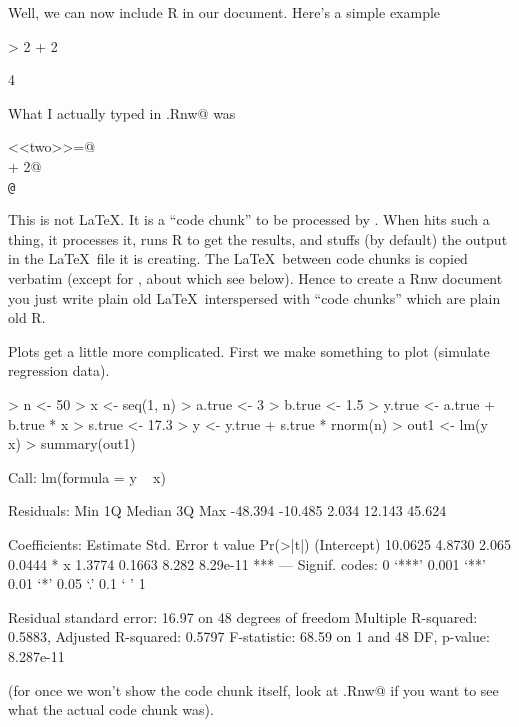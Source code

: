 \documentclass{article}
\begin{document}
Well, we can now include R in our document.  Here's a simple example
\begin{Schunk}
\begin{Sinput}
> 2 + 2
\end{Sinput}
\begin{Soutput}
[1] 4
\end{Soutput}
\end{Schunk}
What I actually typed in \verb@foo.Rnw@ was
\begin{tabbing}
\verb@<<two>>=@ \\
 + 2@ \\
\verb+@+ \\
\end{tabbing}
This is not \LaTeX.  It is a ``code chunk'' to be processed by \verb@Sweave@.
When \verb@Sweave@ hits such a thing, it processes it, runs R to get the
results, and stuffs (by default) the output in the \LaTeX\ file it is
creating.  The \LaTeX\ between code chunks is copied verbatim (except
for \verb@Sexpr@, about which see below).  Hence to create a Rnw document
you just write plain old \LaTeX\ interspersed with ``code chunks'' which
are plain old R.

\pagebreak[3]
Plots get a little more complicated.  First we make something to plot
(simulate regression data).
\begin{Schunk}
\begin{Sinput}
> n <- 50
> x <- seq(1, n)
> a.true <- 3
> b.true <- 1.5
> y.true <- a.true + b.true * x
> s.true <- 17.3
> y <- y.true + s.true * rnorm(n)
> out1 <- lm(y ~ x)
> summary(out1)
\end{Sinput}
\begin{Soutput}
Call:
lm(formula = y ~ x)

Residuals:
    Min      1Q  Median      3Q     Max 
-48.394 -10.485   2.034  12.143  45.624 

Coefficients:
            Estimate Std. Error t value Pr(>|t|)    
(Intercept)  10.0625     4.8730   2.065   0.0444 *  
x             1.3774     0.1663   8.282 8.29e-11 ***
---
Signif. codes:  0 ‘***’ 0.001 ‘**’ 0.01 ‘*’ 0.05 ‘.’ 0.1 ‘ ’ 1

Residual standard error: 16.97 on 48 degrees of freedom
Multiple R-squared:  0.5883,	Adjusted R-squared:  0.5797 
F-statistic: 68.59 on 1 and 48 DF,  p-value: 8.287e-11
\end{Soutput}
\end{Schunk}
(for once we won't show the code chunk itself, look at \verb@foo.Rnw@
if you want to see what the actual code chunk was).
\end{document}
